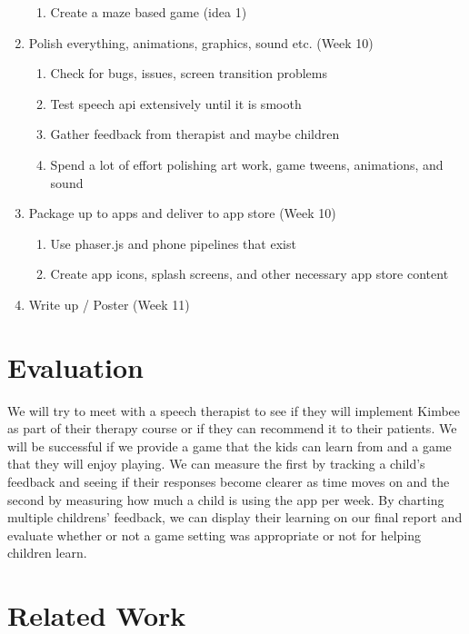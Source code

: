 \documentclass{article}
\begin{document}
\begin{enumerate}
    \begin{enumerate}
        \item Create a maze based game (idea 1)
    \end{enumerate}
    \item Polish everything, animations, graphics, sound etc. (Week 10)
    \begin{enumerate}
        \item Check for bugs, issues, screen transition problems
        \item Test speech api extensively until it is smooth
        \item Gather feedback from therapist and maybe children
        \item Spend a lot of effort polishing art work, game tweens, animations, and sound
    \end{enumerate}
    \item Package up to apps and deliver to app store (Week 10)
    \begin{enumerate}
        \item Use phaser.js and phone pipelines that exist
        \item Create app icons, splash screens, and other necessary app store content
    \end{enumerate}
    \item Write up / Poster (Week 11)
\end{enumerate}

\section{Evaluation}

We will try to meet with a speech therapist to see if they will implement Kimbee as part of their therapy course or if they can recommend it to their patients. We will be successful if we provide a game that the kids can learn from and a game that they will enjoy playing. We can measure the first by tracking a child's feedback and seeing if their responses become clearer as time moves on and the second by measuring how much a child is using the app per week. By charting multiple childrens' feedback, we can display their learning on our final report and evaluate whether or not a game setting was appropriate or not for helping children learn.

\section{Related Work}
\end{document}
